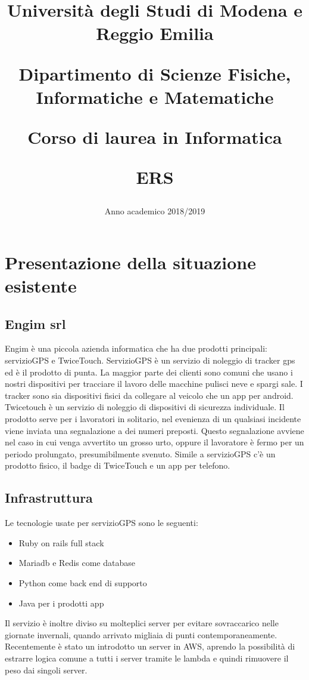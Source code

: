 \documentclass[12pt]{article}
\author{}
\title{
    \huge 
        \textbf{Università degli Studi di Modena e Reggio Emilia}
    \large
        \par Dipartimento di Scienze Fisiche, Informatiche e Matematiche
        \par Corso di laurea in Informatica
    \vfil
        \huge \par \textbf{ERS}
    \vfil
}
\date{Anno academico 2018/2019}
\begin{document}
\maketitle
\section{Presentazione della situazione esistente}
\subsection{Engim srl}
Engim è una piccola azienda informatica che ha due prodotti principali: servizioGPS e TwiceTouch.
ServizioGPS è un servizio di noleggio di tracker gps ed è il prodotto di punta. 
La maggior parte dei clienti sono comuni che usano i nostri dispositivi per tracciare il 
lavoro delle macchine pulisci neve e spargi sale. 
I tracker sono sia dispositivi fisici da collegare al veicolo che un app per 
android. 
\newline Twicetouch è un servizio di noleggio di dispositivi di sicurezza individuale. 
Il prodotto serve per i lavoratori in solitario, nel evenienza di un qualsiasi 
incidente viene inviata una segnalazione a dei numeri preposti. Questo segnalazione 
avviene nel caso in cui venga avvertito un grosso urto, oppure il lavoratore è 
fermo per un periodo prolungato, presumibilmente svenuto. Simile a servizioGPS c'è 
un prodotto fisico, il badge di TwiceTouch e un app per telefono.

\subsection{Infrastruttura}
Le tecnologie usate per servizioGPS sono le seguenti:
\begin{itemize}
  \item Ruby on rails full stack
  \item Mariadb e Redis come database
  \item Python come back end di supporto
  \item Java per i prodotti app
\end{itemize}
Il servizio è inoltre diviso su molteplici server per evitare sovraccarico nelle 
giornate invernali, quando arrivato migliaia di punti contemporaneamente.
Recentemente è stato un introdotto un server in AWS, aprendo la possibilità di 
estrarre logica comune a tutti i server tramite le lambda e quindi rimuovere il 
peso dai singoli server. 
\end{document}
